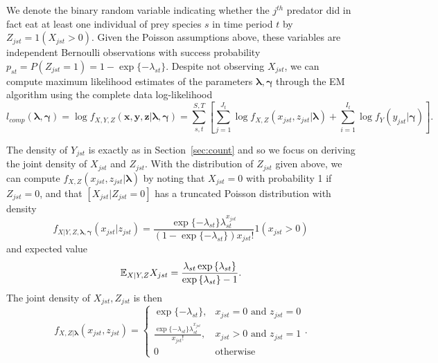 \documentclass[12pt]{article}
\begin{document}
We denote the binary random variable indicating whether the $j^{th}$ predator did in fact eat at least one individual of prey species $s$ in time period $t$ by $Z_{jst} = 1(X_{jst} > 0)$.  Given the Poisson assumptions above, these variables are independent Bernoulli observations with success probability $p_{st} = P(Z_{jst}=1)= 1-\exp\{-\lambda_{st}\}$.  Despite not observing $X_{jst}$, we can compute maximum likelihood estimates of the parameters $\boldsymbol{\lambda}, \boldsymbol{\gamma}$ through the EM algorithm using the complete data log-likelihood
\[
l_{comp}(\boldsymbol{\lambda}, \boldsymbol{\gamma}) = \log f_{X,Y,Z}(\boldsymbol x, \boldsymbol y, \boldsymbol z|\boldsymbol{\lambda}, \boldsymbol{\gamma}) = \sum_{s,t}^{S,T} \left[ \sum_{j=1}^{J_t} \log f_{X,Z}(x_{jst},z_{jst}|\boldsymbol{\lambda}) + \sum_{i=1}^{I_t}\log f_Y(y_{jst}|\boldsymbol{\gamma}) \right].
\]

The density of $Y_{jst}$ is exactly as in Section~\ref{sec:count} and so we focus on deriving the joint density of $X_{jst}$ and $Z_{jst}$.  With the distribution of $Z_{jst}$ given above, we can compute $f_{X,Z}(x_{jst},z_{jst}|\boldsymbol{\lambda})$ by noting that $X_{jst}=0$ with probability 1 if $Z_{jst}=0$, and that $[X_{jst}|Z_{jst}=0]$ has a truncated Poisson distribution with density
\[
  f_{X|Y,Z,\boldsymbol{\lambda},\boldsymbol{\gamma}}(x_{jst}|z_{jst}) =
  \frac{\exp{\{-\lambda_{st}\}} \lambda_{st}^{x_{jst}}}{(1 - \exp{\{-\lambda_{st}\}}) x_{jst}!}1(x_{jst} > 0)
\]
and expected value
\[
\mathbb{E}_{X|Y,Z}X_{jst} = \frac{\lambda_{st} \exp{\{\lambda_{st} \}}}{\exp{\{ \lambda_{st} \}} - 1}.
\]
\noindent The joint density of $X_{jst}, Z_{jst}$ is then 
\begin{equation*}
    f_{X,Z|\boldsymbol{\lambda}}(x_{jst},z_{jst}) = \left\{
    \begin{array}{lr}
      \exp{\{ -\lambda_{st} \}}, & x_{jst}=0 \mbox{ and } z_{jst} = 0 \\
      \frac{\exp{\{-\lambda_{st} \}} \lambda_{st}^{x_{jst}}}{x_{jst}!}, & x_{jst} > 0 \mbox{ and } z_{jst} = 1 \\
      0 & \mbox{otherwise}
    \end{array}
  \right..
\end{equation*}
\end{document}
